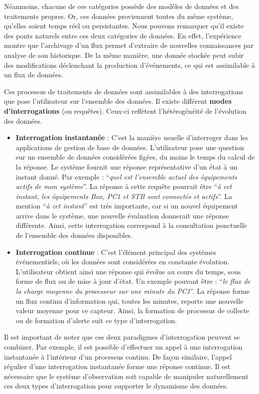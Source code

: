 Néanmoins, chacune de ces catégories possède des modèles de données et des traitements propres. Or, ces données proviennent toutes du même système, qu'elles soient temps réel ou persistantes. Nous pouvons remarquer qu'il existe des ponts naturels entre ces deux catégories de données. En effet, l'expérience montre que l'archivage d'un flux permet d'extraire de nouvelles connaissances par analyse de son historique. De la même manière, une donnée stockée peut subir des modifications déclenchant la production d'événements, ce qui est assimilable à un flux de données.

Ces processus de traitements de données sont assimilables à des interrogations que pose l'utilisateur sur l'ensemble des données. Il existe différent \textbf{modes d'interrogations} (ou requêtes). Ceux-ci reflètent l'hétérogénéité de l'évolution des données.
\begin{itemize}
    \item \textbf{Interrogation instantanée} : C'est la manière usuelle d'interroger dans les applications de gestion de base de données. L'utilisateur pose une question sur un ensemble de données considérées figées, du moins le temps du calcul de la réponse. Le système fournit une réponse représentative d'un état à un instant donné. Par exemple : \enquote{\it quel est l'ensemble actuel des équipements actifs de mon système}. La réponse à cette requête pourrait être \enquote{\it à cet instant, les équipements Box, PC1 et STB sont connectés et actifs}. La mention \enquote{\it à cet instant} est très importante, car si un nouvel équipement arrive dans le système, une nouvelle évaluation donnerait une réponse différente. Ainsi, cette interrogation correspond à la consultation ponctuelle de l'ensemble des données disponibles.
    \item \textbf{Interrogation continue} : C'est l'élément principal des systèmes événementiels, où les données sont considérées en constante évolution. L'utilisateur obtient ainsi une réponse qui évolue au cours du temps, sous forme de flux ou de mise à jour d'état. Un exemple pouvant être : \enquote{\it le flux de la charge moyenne du processeur sur une minute du PC1}. La réponse forme un flux continu d'information qui, toutes les minutes, reporte une nouvelle valeur moyenne pour ce capteur. Ainsi, la formation de processus de collecte ou de formation d'alerte suit ce type d'interrogation.
\end{itemize}

Il est important de noter que ces deux paradigmes d'interrogation peuvent se combiner. Par exemple, il est possible d'effectuer un appel à une interrogation instantanée à l'intérieur d'un processus continu. De façon similaire, l'appel régulier d'une interrogation instantanée forme une réponse continue. Il est nécessaire que le système d'observation soit capable de manipuler naturellement ces deux types d'interrogation pour supporter le dynamisme des données.

